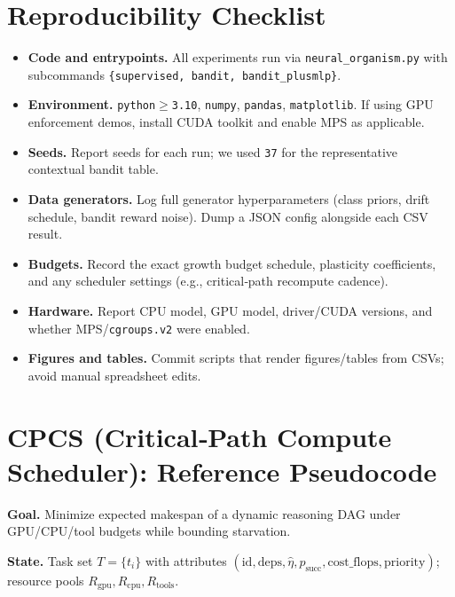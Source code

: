 \documentclass[
]{article}
\begin{document}
\section*{Reproducibility Checklist}
\begin{itemize}
  \item \textbf{Code and entrypoints.} All experiments run via \texttt{neural\_organism.py} with subcommands \texttt{\{supervised, bandit, bandit\_plusmlp\}}.
  \item \textbf{Environment.} \texttt{python$\ge$3.10}, \texttt{numpy}, \texttt{pandas}, \texttt{matplotlib}. If using GPU enforcement demos, install CUDA toolkit and enable MPS as applicable.
  \item \textbf{Seeds.} Report seeds for each run; we used \texttt{37} for the representative contextual bandit table.
  \item \textbf{Data generators.} Log full generator hyperparameters (class priors, drift schedule, bandit reward noise). Dump a JSON config alongside each CSV result.
  \item \textbf{Budgets.} Record the exact growth budget schedule, plasticity coefficients, and any scheduler settings (e.g., critical‑path recompute cadence).
  \item \textbf{Hardware.} Report CPU model, GPU model, driver/CUDA versions, and whether MPS/\texttt{cgroups.v2} were enabled.
  \item \textbf{Figures and tables.} Commit scripts that render figures/tables from CSVs; avoid manual spreadsheet edits.
\end{itemize}

\section*{CPCS (Critical‑Path Compute Scheduler): Reference Pseudocode}
\noindent\textbf{Goal.} Minimize expected makespan of a dynamic reasoning DAG under GPU/CPU/tool budgets while bounding starvation.

\noindent\textbf{State.} Task set $T=\{t_i\}$ with attributes $(\text{id}, \text{deps}, \widehat{\eta}, p_{\text{succ}}, \text{cost\_flops}, \text{priority})$; resource pools $R_{\text{gpu}}, R_{\text{cpu}}, R_{\text{tools}}$.
\end{document}
